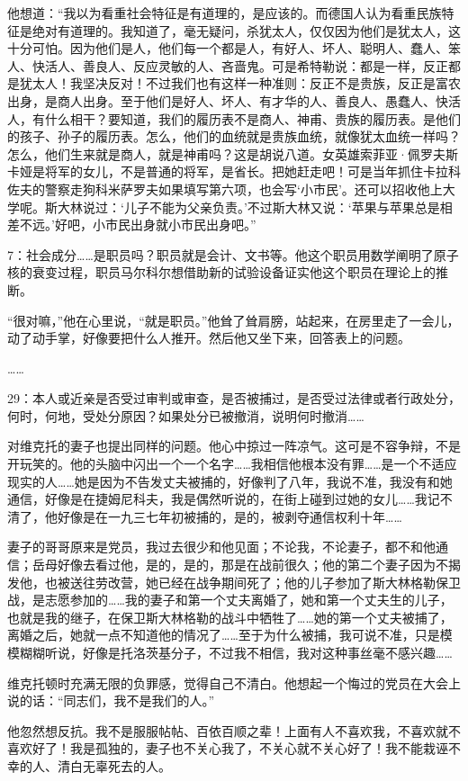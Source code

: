 他想道：“我以为看重社会特征是有道理的，是应该的。而德国人认为看重民族特征是绝对有道理的。我知道了，毫无疑问，杀犹太人，仅仅因为他们是犹太人，这十分可怕。因为他们是人，他们每一个都是人，有好人、坏人、聪明人、蠢人、笨人、快活人、善良人、反应灵敏的人、吝啬鬼。可是希特勒说：都是一样，反正都是犹太人！我坚决反对！不过我们也有这样一种准则：反正不是贵族，反正是富农出身，是商人出身。至于他们是好人、坏人、有才华的人、善良人、愚蠢人、快活人，有什么相干？要知道，我们的履历表不是商人、神甫、贵族的履历表。是他们的孩子、孙子的履历表。怎么，他们的血统就是贵族血统，就像犹太血统一样吗？怎么，他们生来就是商人，就是神甫吗？这是胡说八道。女英雄索菲亚·佩罗夫斯卡娅是将军的女儿，不是普通的将军，是省长。把她赶走吧！可是当年抓住卡拉科佐夫的警察走狗科米萨罗夫如果填写第六项，也会写‘小市民’。还可以招收他上大学呢。斯大林说过：‘儿子不能为父亲负责。’不过斯大林又说：‘苹果与苹果总是相差不远。’好吧，小市民出身就小市民出身吧。”

7：社会成分……是职员吗？职员就是会计、文书等。他这个职员用数学阐明了原子核的衰变过程，职员马尔科尔想借助新的试验设备证实他这个职员在理论上的推断。

“很对嘛，”他在心里说，“就是职员。”他耸了耸肩膀，站起来，在房里走了一会儿，动了动手掌，好像要把什么人推开。然后他又坐下来，回答表上的问题。

……

29：本人或近亲是否受过审判或审查，是否被捕过，是否受过法律或者行政处分，何时，何地，受处分原因？如果处分已被撤消，说明何时撤消……

对维克托的妻子也提出同样的问题。他心中掠过一阵凉气。这可是不容争辩，不是开玩笑的。他的头脑中闪出一个一个名字……我相信他根本没有罪……是一个不适应现实的人……她是因为不告发丈夫被捕的，好像判了八年，我说不准，我没有和她通信，好像是在捷姆尼科夫，我是偶然听说的，在街上碰到过她的女儿……我记不清了，他好像是在一九三七年初被捕的，是的，被剥夺通信权利十年……

妻子的哥哥原来是党员，我过去很少和他见面；不论我，不论妻子，都不和他通信；岳母好像去看过他，是的，是的，那是在战前很久；他的第二个妻子因为不揭发他，也被送往劳改营，她已经在战争期间死了；他的儿子参加了斯大林格勒保卫战，是志愿参加的……我的妻子和第一个丈夫离婚了，她和第一个丈夫生的儿子，也就是我的继子，在保卫斯大林格勒的战斗中牺牲了……她的第一个丈夫被捕了，离婚之后，她就一点不知道他的情况了……至于为什么被捕，我可说不准，只是模模糊糊听说，好像是托洛茨基分子，不过我不相信，我对这种事丝毫不感兴趣……

维克托顿时充满无限的负罪感，觉得自己不清白。他想起一个悔过的党员在大会上说的话：“同志们，我不是我们的人。”

他忽然想反抗。我不是服服帖帖、百依百顺之辈！上面有人不喜欢我，不喜欢就不喜欢好了！我是孤独的，妻子也不关心我了，不关心就不关心好了！我不能栽诬不幸的人、清白无辜死去的人。

